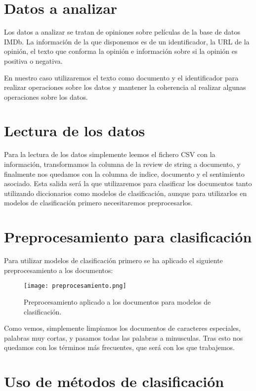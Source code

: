 \section{Datos a analizar}

Los datos a analizar se tratan de opiniones sobre películas de la base de datos IMDb. La información de la que disponemos es de un identificador, la URL de la opinión, el texto que conforma la opinión e información sobre si la opinión es positiva o negativa.

En nuestro caso utilizaremos el texto como documento y el identificador para realizar operaciones sobre los datos y mantener la coherencia al realizar algunas operaciones sobre los datos.

\section{Lectura de los datos}

Para la lectura de los datos simplemente leemos el fichero CSV con la información, transformamos la columna de la review de string a documento, y finalmente nos quedamos con la columna de indice, documento y el sentimiento asociado. Esta salida será la que utilizaremos para clasificar los documentos tanto utilizando diccionarios como modelos de clasificación, aunque para utilizarlos en modelos de clasificación primero necesitaremos preprocesarlos.

\section{Preprocesamiento para clasificación}

Para utilizar modelos de clasificación primero se ha aplicado el siguiente preprocesamiento a los documentos:

\begin{figure}[H]
	\centering
	\texttt{[image: preprocesamiento.png]}
	\caption{Preprocesamiento aplicado a los documentos para modelos de clasificación.}
	\label{fig:preprocesamiento}
\end{figure}


Como vemos, simplemente limpiamos los documentos de caracteres especiales, palabras muy cortas, y pasamos todas las palabras a minusculas. Tras esto nos quedamos con los términos más frecuentes, que será con los que trabajemos.

\section{Uso de métodos de clasificación}

